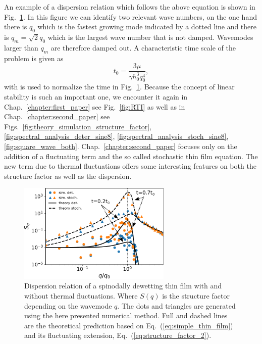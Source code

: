 An example of a dispersion relation which follows the above equation is shown in Fig.~\ref{fig:dispertion_1}.
In this figure we can identify two relevant wave numbers, on the one hand there is $q_0$ which is the fastest growing mode indicated by a dotted line and there is $q_m = \sqrt{2}q_0$ which is the largest wave number that is not damped.
Wavemodes larger than $q_m$ are therefore damped out.
A characteristic time scale of the problem is given as
\begin{equation}
    t_0 = \frac{3\mu}{\gamma h_0^3 q_0^4},
\end{equation}
with is used to normalize the time in Fig.~\ref{fig:dispertion_1}.
Because the concept of linear stability is such an important one, we encounter it again in Chap.~\ref{chapter:first_paper} see Fig.~\ref{fig:RTI} as well as in Chap.~\ref{chapter:second_paper} see Figs.~\ref{fig:theory_simulation_structure_factor}, \ref{fig:spectral_analysis_deter_sine8}, \ref{fig:spectral_analysis_stoch_sine8}, \ref{fig:square_wave_both}.
Chap.~\ref{chapter:second_paper} focuses only on the addition of a fluctuating term and the so called stochastic thin film equation.
The new term due to thermal fluctuations offers some interesting features on both the structure factor as well as the dispersion.

\begin{figure}
    \centering
    \includegraphics[width=0.65\textwidth]{graphics/spectratheta20.pdf}
    \caption{Dispersion relation of a spinodally dewetting thin film with and without thermal fluctuations.
    Where $S(q)$ is the structure factor depending on the wavemode $q$.
    The dots and triangles are generated using the here presented numerical method. 
    Full and dashed lines are the theoretical prediction based on Eq.~(\ref{eq:simple_thin_film}) and its fluctuating extension, Eq.~(\ref{eq:structure_factor_2}).
    }
    \label{fig:dispertion_1}
\end{figure}

